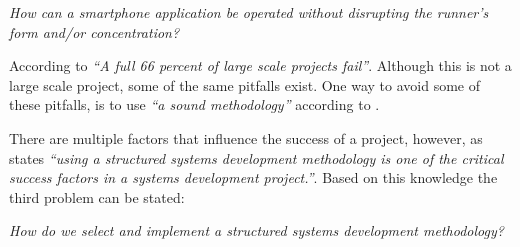 \begin{center}
\textit{How can a smartphone application be operated without disrupting the runner's form and/or concentration?}
\end{center}
\pagebreak


\noindent According to \citet{gartner:failure} \textit{``A full 66 percent of large scale projects fail”}.
Although this is not a large scale project, some of the same pitfalls exist.
One way to avoid some of these pitfalls, is to use \textit{``a sound methodology”} according to \citet{dorsey:methodologyReason}.

There are multiple factors that influence the success of a project, however, as \citet{dorsey:methodologyReason} states \textit{``using a structured systems development methodology is one of the critical success factors in a	systems development project.”}.
Based on this knowledge the third problem can be stated:

\begin{center}
	\textit{How do we select and implement a structured systems development methodology?}
\end{center}
